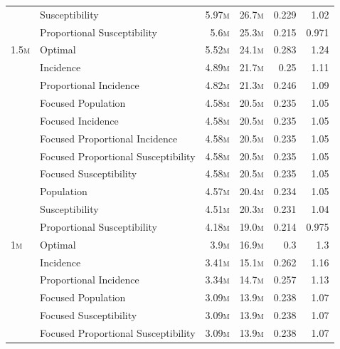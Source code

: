 \begin{fwtable}
\begin{tabular}{llrrrr}
        & Susceptibility &   5.97\textsc{m} &    26.7\textsc{m} &          0.229 &        1.02 \\
        & Proportional Susceptibility &    5.6\textsc{m}&    25.3\textsc{m}&          0.215 &       0.971 \\
1.5\textsc{m}& Optimal &   5.52\textsc{m}&    24.1\textsc{m}&          0.283 &        1.24 \\
        & Incidence &   4.89\textsc{m}&    21.7\textsc{m}&           0.25 &        1.11 \\
        & Proportional Incidence &   4.82\textsc{m}&    21.3\textsc{m}&          0.246 &        1.09 \\
        & Focused Population &   4.58\textsc{m}&    20.5\textsc{m}&          0.235 &        1.05 \\
        & Focused Incidence &   4.58\textsc{m}&    20.5\textsc{m}&          0.235 &        1.05 \\
        & Focused Proportional Incidence &   4.58\textsc{m}&    20.5\textsc{m}&          0.235 &        1.05 \\
        & Focused Proportional Susceptibility &   4.58\textsc{m}&    20.5\textsc{m}&          0.235 &        1.05 \\
        & Focused Susceptibility &   4.58\textsc{m}&    20.5\textsc{m}&          0.235 &        1.05 \\
        & Population &   4.57\textsc{m}&    20.4\textsc{m}&          0.234 &        1.05 \\
        & Susceptibility &   4.51\textsc{m}&    20.3\textsc{m}&          0.231 &        1.04 \\
        & Proportional Susceptibility &   4.18\textsc{m}&     19.0\textsc{m}&          0.214 &       0.975 \\
1\textsc{m}& Optimal &    3.9\textsc{m}&    16.9\textsc{m}&            0.3 &         1.3 \\
        & Incidence &   3.41\textsc{m}&    15.1\textsc{m}&          0.262 &        1.16 \\
        & Proportional Incidence &   3.34\textsc{m}&    14.7\textsc{m}&          0.257 &        1.13 \\
        & Focused Population &   3.09\textsc{m}&    13.9\textsc{m}&          0.238 &        1.07 \\
        & Focused Susceptibility &   3.09\textsc{m}&    13.9\textsc{m}&          0.238 &        1.07 \\
        & Focused Proportional Susceptibility &   3.09\textsc{m}&    13.9\textsc{m}&          0.238 &        1.07 \\

\end{tabular}
\end{fwtable}
